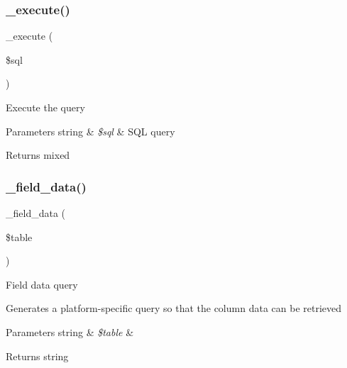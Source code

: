 \subsubsection{\texorpdfstring{\+\_\+execute()}{\_execute()}}
{\footnotesize\ttfamily \+\_\+execute (\begin{DoxyParamCaption}\item[{}]{\$sql }\end{DoxyParamCaption})\hspace{0.3cm}{\ttfamily [protected]}}

Execute the query


\begin{DoxyParams}[1]{Parameters}
string & {\em \$sql} & S\+QL query \\
\hline
\end{DoxyParams}
\begin{DoxyReturn}{Returns}
mixed 
\end{DoxyReturn}
\mbox{\label{class_c_i___d_b__pdo__driver_a95247d9671893adc3444cb184ad32ea1}} 
\subsubsection{\texorpdfstring{\+\_\+field\+\_\+data()}{\_field\_data()}}
{\footnotesize\ttfamily \+\_\+field\+\_\+data (\begin{DoxyParamCaption}\item[{}]{\$table }\end{DoxyParamCaption})\hspace{0.3cm}{\ttfamily [protected]}}

Field data query

Generates a platform-\/specific query so that the column data can be retrieved


\begin{DoxyParams}[1]{Parameters}
string & {\em \$table} & \\
\hline
\end{DoxyParams}
\begin{DoxyReturn}{Returns}
string 
\end{DoxyReturn}
\mbox{\label{class_c_i___d_b__pdo__driver_ac81ac882c1d54347d810199a15856aac}} 
